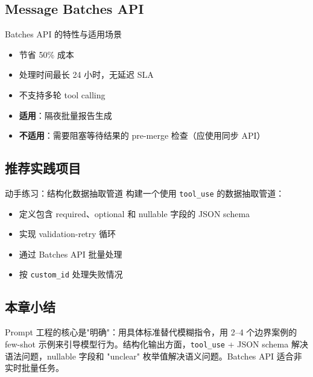 \subsection{Message Batches API}

\begin{knowledgebox}{Batches API 的特性与适用场景}
\begin{itemize}[leftmargin=1.5em]
    \item 节省 50\% 成本
    \item 处理时间最长 24 小时，无延迟 SLA
    \item 不支持多轮 tool calling
    \item \textbf{适用}：隔夜批量报告生成
    \item \textbf{不适用}：需要阻塞等待结果的 pre-merge 检查（应使用同步 API）
\end{itemize}
\end{knowledgebox}

\subsection{推荐实践项目}

\begin{knowledgebox}{动手练习：结构化数据抽取管道}
构建一个使用 \texttt{tool\_use} 的数据抽取管道：
\begin{itemize}[leftmargin=1.5em]
    \item 定义包含 required、optional 和 nullable 字段的 JSON schema
    \item 实现 validation-retry 循环
    \item 通过 Batches API 批量处理
    \item 按 \texttt{custom\_id} 处理失败情况
\end{itemize}
\end{knowledgebox}

\subsection{本章小结}

Prompt 工程的核心是"明确"：用具体标准替代模糊指令，用 2--4 个边界案例的 few-shot 示例来引导模型行为。结构化输出方面，\texttt{tool\_use} + JSON schema 解决语法问题，nullable 字段和 "unclear" 枚举值解决语义问题。Batches API 适合非实时批量任务。

